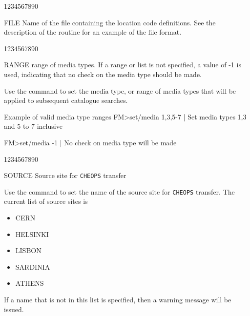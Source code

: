 \begin{DLtt}{1234567890}
\item[FILE] Name of the file containing the location code
            definitions. See the description of the 
            routine for an example of the file format.
\end{DLtt}


\begin{DLtt}{1234567890}
\item[RANGE]range of media types. If a range or list is not specified,
a value of -1 is used, indicating that no check on the media type
should be made.
\end{DLtt}

Use the  command to set the media type, or range of media types
that will be applied to subsequent catalogue searches.

\begin{XMPt}{Example of valid media type ranges}
FM>set/media 1,3,5-7 | Set media types 1,3 and 5 to 7 inclusive

FM>set/media -1      | No check on media type will be made
\end{XMPt}

\begin{DLtt}{1234567890}
\item[SOURCE]Source site for {\tt CHEOPS} transfer
\end{DLtt}
Use the  command to set the name of the
source site for {\tt CHEOPS} transfer. The current list
of source sites is

\begin{itemize}
\item CERN
\item HELSINKI
\item LISBON
\item SARDINIA
\item ATHENS
\end{itemize}

If a name that is not in this list is specified, then
a warning message will be issued.



